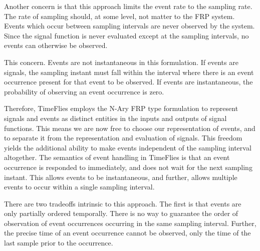 
Another concern is that this approach limits the event rate to the sampling rate.
The rate of sampling should, at some level, not matter to the FRP system. Events
which occur between sampling intervals are never observed by the
system.   
Since the signal function is never evaluated except at the sampling intervals, no
events can otherwise be observed.

This  concern. Events are not instantaneous in this
formulation. If events are signals, the sampling instant must fall within
the interval where there is an event occurrence present for that event to be
observed. If events are instantaneous, the probability of observing an event 
occurrence is zero. 

Therefore, TimeFlies employs the N-Ary FRP type formulation to represent signals and
events as distinct entities in the inputs and outputs of signal functions. This means
we are now free to choose our representation of events, and to separate it from the
representation and evaluation of signals.
%
This freedom yields the additional ability to make events independent of the sampling
interval altogether. The semantics of event handling in TimeFlies is that an event occurrence
is responded to immediately, and does not wait for the next sampling
instant. 
This allows events to be instantaneous, and further, allows multiple
events to occur within a single sampling interval.


There are two tradeoffs intrinsic to this approach. The first is that events are only partially ordered
temporally. There is no way to guarantee the order of observation of event occurrences occurring in the
same sampling interval. Further, the precise time of an event occurrence cannot be observed, only the 
time of the last \rn{[signal?]} sample prior to the occurrence.

